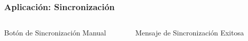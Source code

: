 \documentclass[14pt]{beamer}
\begin{document}
\begin{frame}
\frametitle{Aplicación: Sincronización}

\begin{columns}

\begin{column}{0.5\textwidth}
\begin{center}

\begin{small}
\caption{Botón de Sincronización Manual}
\end{small}
\end{center}
\end{column}


\begin{column}{0.5\textwidth}
\begin{center}

\begin{small}
\caption{Mensaje de Sincronización Exitosa}
\end{small}
\end{center}
\end{column}


\end{columns}

\end{frame}
\end{document}
